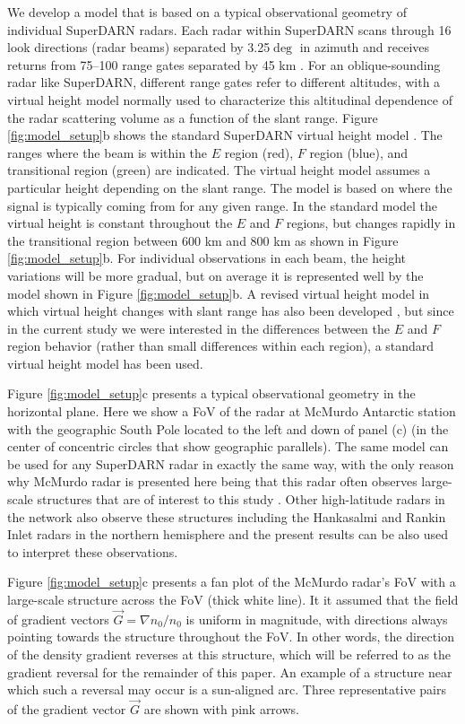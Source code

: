 We develop a model that is based on a typical observational geometry of individual SuperDARN radars. Each radar within SuperDARN scans through 16 look directions (radar beams) separated by 3.25\(\deg\) in azimuth and receives returns from 75--100 range gates separated by 45 km \citep{Chisham2007}. For an oblique-sounding radar like SuperDARN, different range gates refer to different altitudes, with a virtual height model normally used to characterize this altitudinal dependence of the radar scattering volume as a function of the slant range. Figure \ref{fig:model_setup}b shows the standard SuperDARN virtual height model \citep{Chisham2008}. The ranges where the beam is within the \(E\) region (red), \(F\) region (blue), and transitional region (green) are indicated. The virtual height model assumes a particular height depending on the slant range. The model is based on where the signal is typically coming from for any given range. In the standard model the virtual height is constant throughout the \(E\) and \(F\) regions, but changes rapidly in the transitional region between 600 km and 800 km as shown in Figure \ref{fig:model_setup}b. For individual observations in each beam, the height variations will be more gradual, but on average it is represented well by the model shown in Figure \ref{fig:model_setup}b. A revised virtual height model in which virtual height changes with slant range has also been developed \citep{Chisham2008}, but since in the current study we were interested in the differences between the \(E\) and \(F\) region behavior (rather than small differences within each region), a standard virtual height model has been used.


Figure \ref{fig:model_setup}c presents a typical observational geometry in the horizontal plane. Here we show a FoV of the radar at McMurdo Antarctic station with the geographic South Pole located to the left and down of panel (c) (in the center of concentric circles that show geographic parallels). The same model can be used for any SuperDARN radar in exactly the same way, with the only reason why McMurdo radar is presented here being that this radar often observes large-scale structures that are of interest to this study \citep{Bristow2011,Lamarche2015}. Other high-latitude radars in the network also observe these structures including the Hankasalmi \citep{Milan2002a} and Rankin Inlet \citep{Koustov2012} radars in the northern hemisphere and the present results can be also used to interpret these observations.


Figure \ref{fig:model_setup}c presents a fan plot of the McMurdo radar's FoV with a large-scale structure across the FoV (thick white line). It it assumed that the field of gradient vectors \(\vec{G}=\nabla n_0/n_0\) is uniform in magnitude, with directions always pointing towards the structure throughout the FoV. In other words, the direction of the density gradient reverses at this structure, which will be referred to as the gradient reversal for the remainder of this paper. An example of a structure near which such a reversal may occur is a sun-aligned arc. Three representative pairs of the gradient vector \(\vec{G}\) are shown with pink arrows.

